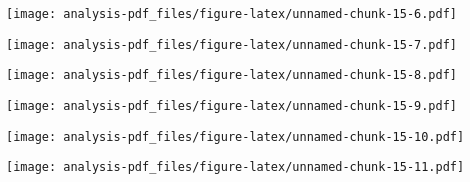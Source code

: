 \documentclass[
]{article}
\newenvironment{Shaded}{\begin{snugshade}}{\end{snugshade}}
\newcommand{\KeywordTok}[1]{\textcolor[rgb]{0.13,0.29,0.53}{\textbf{#1}}}
\newcommand{\NormalTok}[1]{#1}
\newcommand{\OperatorTok}[1]{\textcolor[rgb]{0.81,0.36,0.00}{\textbf{#1}}}
\begin{document}
\texttt{[image: analysis-pdf\_files/figure-latex/unnamed-chunk-15-6.pdf]}

\begin{Shaded}
\end{Shaded}

\texttt{[image: analysis-pdf\_files/figure-latex/unnamed-chunk-15-7.pdf]}

\begin{Shaded}
\end{Shaded}

\texttt{[image: analysis-pdf\_files/figure-latex/unnamed-chunk-15-8.pdf]}

\begin{Shaded}
\end{Shaded}

\texttt{[image: analysis-pdf\_files/figure-latex/unnamed-chunk-15-9.pdf]}

\begin{Shaded}
\end{Shaded}

\texttt{[image: analysis-pdf\_files/figure-latex/unnamed-chunk-15-10.pdf]}

\begin{Shaded}
\end{Shaded}

\texttt{[image: analysis-pdf\_files/figure-latex/unnamed-chunk-15-11.pdf]}

\begin{Shaded}
\end{Shaded}
\end{document}
